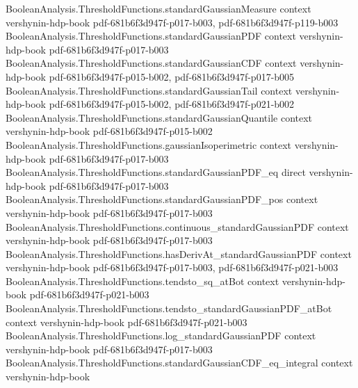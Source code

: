 \begin{lemma}
\leanok
{}
\proofstep
  {BooleanAnalysis.ThresholdFunctions.standardGaussianMeasure}
  {context}
  {vershynin-hdp-book}
  {pdf-681b6f3d947f-p017-b003,
    pdf-681b6f3d947f-p119-b003}
\proofstep
  {BooleanAnalysis.ThresholdFunctions.standardGaussianPDF}
  {context}
  {vershynin-hdp-book}
  {pdf-681b6f3d947f-p017-b003}
\proofstep
  {BooleanAnalysis.ThresholdFunctions.standardGaussianCDF}
  {context}
  {vershynin-hdp-book}
  {pdf-681b6f3d947f-p015-b002,
    pdf-681b6f3d947f-p017-b005}
\proofstep
  {BooleanAnalysis.ThresholdFunctions.standardGaussianTail}
  {context}
  {vershynin-hdp-book}
  {pdf-681b6f3d947f-p015-b002,
    pdf-681b6f3d947f-p021-b002}
\proofstep
  {BooleanAnalysis.ThresholdFunctions.standardGaussianQuantile}
  {context}
  {vershynin-hdp-book}
  {pdf-681b6f3d947f-p015-b002}
\proofstep
  {BooleanAnalysis.ThresholdFunctions.gaussianIsoperimetric}
  {context}
  {vershynin-hdp-book}
  {pdf-681b6f3d947f-p017-b003}
\proofstep
  {BooleanAnalysis.ThresholdFunctions.standardGaussianPDF_eq}
  {direct}
  {vershynin-hdp-book}
  {pdf-681b6f3d947f-p017-b003}
\proofstep
  {BooleanAnalysis.ThresholdFunctions.standardGaussianPDF_pos}
  {context}
  {vershynin-hdp-book}
  {pdf-681b6f3d947f-p017-b003}
\proofstep
  {BooleanAnalysis.ThresholdFunctions.continuous_standardGaussianPDF}
  {context}
  {vershynin-hdp-book}
  {pdf-681b6f3d947f-p017-b003}
\proofstep
  {BooleanAnalysis.ThresholdFunctions.hasDerivAt_standardGaussianPDF}
  {context}
  {vershynin-hdp-book}
  {pdf-681b6f3d947f-p017-b003,
    pdf-681b6f3d947f-p021-b003}
\proofstep
  {BooleanAnalysis.ThresholdFunctions.tendsto_sq_atBot}
  {context}
  {vershynin-hdp-book}
  {pdf-681b6f3d947f-p021-b003}
\proofstep
  {BooleanAnalysis.ThresholdFunctions.tendsto_standardGaussianPDF_atBot}
  {context}
  {vershynin-hdp-book}
  {pdf-681b6f3d947f-p021-b003}
\proofstep
  {BooleanAnalysis.ThresholdFunctions.log_standardGaussianPDF}
  {context}
  {vershynin-hdp-book}
  {pdf-681b6f3d947f-p017-b003}
\proofstep
  {BooleanAnalysis.ThresholdFunctions.standardGaussianCDF_eq_integral}
  {context}
  {vershynin-hdp-book}

\end{lemma}
